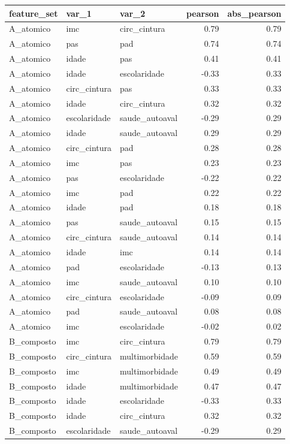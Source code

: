 \begin{tabular}{lllrr}
\toprule
feature_set & var_1 & var_2 & pearson & abs_pearson \\
\midrule
A_atomico & imc & circ_cintura & 0.79 & 0.79 \\
A_atomico & pas & pad & 0.74 & 0.74 \\
A_atomico & idade & pas & 0.41 & 0.41 \\
A_atomico & idade & escolaridade & -0.33 & 0.33 \\
A_atomico & circ_cintura & pas & 0.33 & 0.33 \\
A_atomico & idade & circ_cintura & 0.32 & 0.32 \\
A_atomico & escolaridade & saude_autoaval & -0.29 & 0.29 \\
A_atomico & idade & saude_autoaval & 0.29 & 0.29 \\
A_atomico & circ_cintura & pad & 0.28 & 0.28 \\
A_atomico & imc & pas & 0.23 & 0.23 \\
A_atomico & pas & escolaridade & -0.22 & 0.22 \\
A_atomico & imc & pad & 0.22 & 0.22 \\
A_atomico & idade & pad & 0.18 & 0.18 \\
A_atomico & pas & saude_autoaval & 0.15 & 0.15 \\
A_atomico & circ_cintura & saude_autoaval & 0.14 & 0.14 \\
A_atomico & idade & imc & 0.14 & 0.14 \\
A_atomico & pad & escolaridade & -0.13 & 0.13 \\
A_atomico & imc & saude_autoaval & 0.10 & 0.10 \\
A_atomico & circ_cintura & escolaridade & -0.09 & 0.09 \\
A_atomico & pad & saude_autoaval & 0.08 & 0.08 \\
A_atomico & imc & escolaridade & -0.02 & 0.02 \\
B_composto & imc & circ_cintura & 0.79 & 0.79 \\
B_composto & circ_cintura & multimorbidade & 0.59 & 0.59 \\
B_composto & imc & multimorbidade & 0.49 & 0.49 \\
B_composto & idade & multimorbidade & 0.47 & 0.47 \\
B_composto & idade & escolaridade & -0.33 & 0.33 \\
B_composto & idade & circ_cintura & 0.32 & 0.32 \\
B_composto & escolaridade & saude_autoaval & -0.29 & 0.29 \\

\end{tabular}
